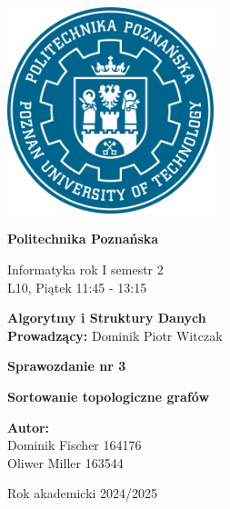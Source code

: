 \documentclass{article}
\begin{document}
	
	
	\thispagestyle{empty} %
	
	\begin{center}
		\includegraphics[width=6cm]{Image/PP-PUT-LOGO.png}
		\vspace{1cm}
		
		{\Huge\bfseries Politechnika Poznańska}
		
		\vspace{1cm}
		
		{\large Informatyka rok I semestr 2} \\[0.3cm]
		L10, Piątek 11:45 - 13:15
		
		\vspace{1.5cm}
		
		{\LARGE\bfseries Algorytmy i Struktury Danych} \\[0.3cm]
		\textbf{Prowadzący:} Dominik Piotr Witczak
		
		\vspace{2cm}
		
		{\LARGE\bfseries Sprawozdanie nr 3} 
		
		\vspace{1cm}
		
		{\Large\bfseries Sortowanie topologiczne grafów}
		
		\vspace{3cm}
		
		\begin{flushright}
			\textbf{Autor:} \\[0.2cm]
			Dominik Fischer 164176 \\
			Oliwer Miller 163544
		\end{flushright}
		
		\vspace{1.5cm}
		Rok akademicki 2024/2025
	\end{center}
	
\end{document}
